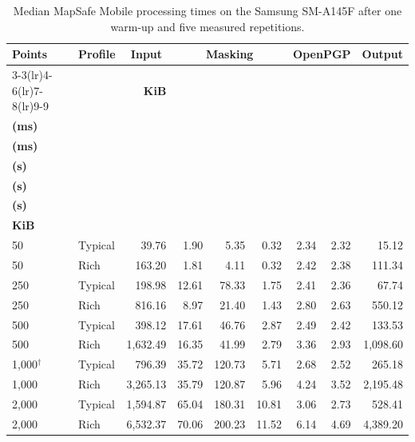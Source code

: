 \documentclass[]{interact}
\begin{document}
\begin{table}[t]
\centering
\caption{Median MapSafe Mobile processing times on the Samsung SM-A145F after one warm-up and five measured repetitions.}
\label{tab:performance-results}
\small
\setlength{\tabcolsep}{2pt}
\begin{tabular*}{\textwidth}{@{\extracolsep{\fill}}llrrrrrrr@{}}
\toprule
\textbf{Points} & \textbf{Profile} & \multicolumn{1}{c}{\textbf{Input}} & \multicolumn{3}{c}{\textbf{Masking}} & \multicolumn{2}{c}{\textbf{OpenPGP}} & \multicolumn{1}{c}{\textbf{Output}} \\
\cmidrule(lr){3-3}\cmidrule(lr){4-6}\cmidrule(lr){7-8}\cmidrule(lr){9-9}
& & \textbf{KiB} & \begin{tabular}[c]{@{}c@{}}\textbf{Core}\\\textbf{(ms)}\end{tabular} & \begin{tabular}[c]{@{}c@{}}\textbf{Core+SM}\\\textbf{(ms)}\end{tabular} & \begin{tabular}[c]{@{}c@{}}\textbf{Complete}\\\textbf{(s)}\end{tabular} & \begin{tabular}[c]{@{}c@{}}\textbf{Encrypt}\\\textbf{(s)}\end{tabular} & \begin{tabular}[c]{@{}c@{}}\textbf{Decrypt}\\\textbf{(s)}\end{tabular} & \begin{tabular}[c]{@{}c@{}}\textbf{PGP}\\\textbf{KiB}\end{tabular} \\
\midrule
50    & Typical & 39.76    & 1.90 & 5.35 & 0.32 & 2.34 & 2.32 & 15.12 \\
50    & Rich    & 163.20   & 1.81 & 4.11 & 0.32 & 2.42 & 2.38 & 111.34 \\
250   & Typical & 198.98   & 12.61 & 78.33 & 1.75 & 2.41 & 2.36 & 67.74 \\
250   & Rich    & 816.16   & 8.97 & 21.40 & 1.43 & 2.80 & 2.63 & 550.12 \\
500   & Typical & 398.12   & 17.61 & 46.76 & 2.87 & 2.49 & 2.42 & 133.53 \\
500   & Rich    & 1,632.49 & 16.35 & 41.99 & 2.79 & 3.36 & 2.93 & 1,098.60 \\
1,000$^{\dagger}$ & Typical & 796.39   & 35.72 & 120.73 & 5.71 & 2.68 & 2.52 & 265.18 \\
1,000 & Rich    & 3,265.13 & 35.79 & 120.87 & 5.96 & 4.24 & 3.52 & 2,195.48 \\
2,000 & Typical & 1,594.87 & 65.04 & 180.31 & 10.81 & 3.06 & 2.73 & 528.41 \\
2,000 & Rich    & 6,532.37 & 70.06 & 200.23 & 11.52 & 6.14 & 4.69 & 4,389.20 \\
\bottomrule
\end{tabular*}
\end{table}
\end{document}
